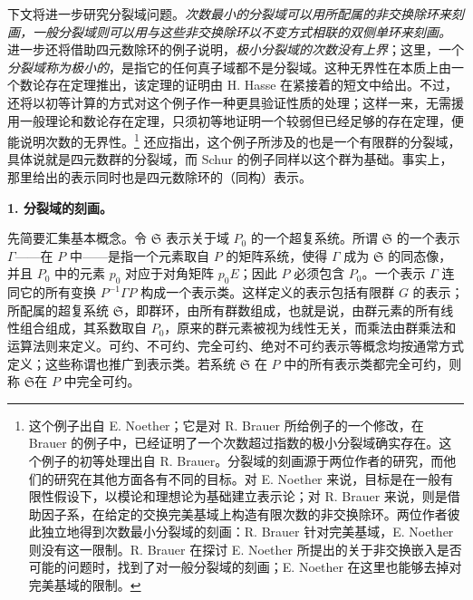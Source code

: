 \documentclass[11pt]{article}
\providecommand{\srcspaced}[1]{\emph{#1}}
\providecommand{\mS}{\mathfrak{S}}
\begin{document}
下文将进一步研究分裂域问题。\srcspaced{次数最小的分裂域可以用所配属的非交换除环来刻画，一般分裂域则可以用与这些非交换除环以不变方式相联的双侧单环来刻画。} 进一步还将借助四元数除环的例子说明，\srcspaced{极小分裂域的次数没有上界}；这里，一个\srcspaced{分裂域称为极小的}，是指它的任何真子域都不是分裂域。这种无界性在本质上由一个数论存在定理推出，该定理的证明由 H. Hasse 在紧接着的短文中给出。不过，还将以初等计算的方式对这个例子作一种更具验证性质的处理；这样一来，无需援用一般理论和数论存在定理，只须初等地证明一个较弱但已经足够的存在定理，便能说明次数的无界性。\footnote{这个例子出自 E. Noether；它是对 R. Brauer 所给例子的一个修改，在 Brauer 的例子中，已经证明了一个次数超过指数的极小分裂域确实存在。这个例子的初等处理出自 R. Brauer。分裂域的刻画源于两位作者的研究，而他们的研究在其他方面各有不同的目标。对 E. Noether 来说，目标是在一般有限性假设下，以模论和理想论为基础建立表示论；对 R. Brauer 来说，则是借助因子系，在给定的交换完美基域上构造有限次数的非交换除环。两位作者彼此独立地得到次数最小分裂域的刻画：R. Brauer 针对完美基域，E. Noether 则没有这一限制。R. Brauer 在探讨 E. Noether 所提出的关于非交换嵌入是否可能的问题时，找到了对一般分裂域的刻画；E. Noether 在这里也能够去掉对完美基域的限制。} 还应指出，这个例子所涉及的也是一个有限群的分裂域，具体说就是四元数群的分裂域，而 Schur 的例子同样以这个群为基础。事实上，那里给出的表示同时也是四元数除环的（同构）表示。

\begin{center}
\textbf{1. 分裂域的刻画。}
\end{center}

先简要汇集基本概念。令 $\mS$ 表示关于域 $P_0$ 的一个超复系统。所谓 $\mS$ 的一个表示 $\Gamma$——在 $P$ 中——是指一个元素取自 $P$ 的矩阵系统，使得 $\Gamma$ 成为 $\mS$ 的同态像，并且 $P_0$ 中的元素 $p_0$ 对应于对角矩阵 $p_0E$；因此 $P$ 必须包含 $P_0$。一个表示 $\Gamma$ 连同它的所有变换 $P^{-1}\Gamma P$ 构成一个表示类。这样定义的表示包括有限群 $G$ 的表示；所配属的超复系统 $\mS$，即\guillemotright{}群环\guillemotleft{}，由所有\guillemotright{}群数\guillemotleft{}组成，也就是说，由群元素的所有线性组合组成，其系数取自 $P_0$，原来的群元素被视为线性无关，而乘法由群乘法和运算法则来定义。\guillemotright{}可约\guillemotleft{}、\guillemotright{}不可约\guillemotleft{}、\guillemotright{}完全可约\guillemotleft{}、\guillemotright{}绝对不可约\guillemotleft{}表示等概念均按通常方式定义；这些称谓也推广到表示类。若系统 $\mS$ 在 $P$ 中的所有表示类都完全可约，则称 $\mS$\guillemotright{}在 $P$ 中完全可约\guillemotleft{}。
\end{document}
